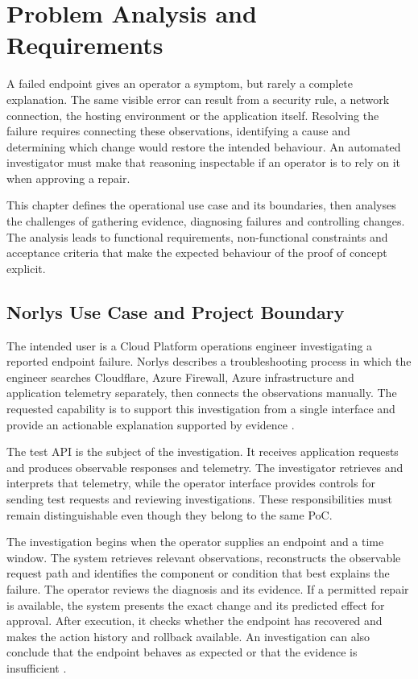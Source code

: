 \chapter{Problem Analysis and Requirements}
\label{cha:requirements}

A failed endpoint gives an operator a symptom, but rarely a complete
explanation. The same visible error can result from a security rule, a
network connection, the hosting environment or the application itself.
Resolving the failure requires connecting these observations, identifying
a cause and determining which change would restore the intended behaviour.
An automated investigator must make that reasoning inspectable if an
operator is to rely on it when approving a repair.

This chapter defines the operational use case and its boundaries, then
analyses the challenges of gathering evidence, diagnosing failures and
controlling changes. The analysis leads to functional requirements,
non-functional constraints and acceptance criteria that make the expected
behaviour of the proof of concept explicit.

\section{Norlys Use Case and Project Boundary}
\label{sec:requirements:context}

The intended user is a Cloud Platform operations engineer investigating a
reported endpoint failure. Norlys describes a troubleshooting process in
which the engineer searches Cloudflare, Azure Firewall, Azure infrastructure
and application telemetry separately, then connects the observations
manually. The requested capability is to support this investigation from a
single interface and provide an actionable explanation supported by
evidence \parencite[User Story, Background]{norlys_operations_agents}.

The test API is the subject of the investigation. It receives application
requests and produces observable responses and telemetry. The investigator
retrieves and interprets that telemetry, while the operator interface
provides controls for sending test requests and reviewing investigations.
These responsibilities must remain distinguishable even though they belong
to the same PoC.

The investigation begins when the operator supplies an endpoint and a time
window. The system retrieves relevant observations, reconstructs the
observable request path and identifies the component or condition that
best explains the failure. The operator reviews the diagnosis and its
evidence. If a permitted repair is available, the system presents the exact
change and its predicted effect for approval. After execution, it checks
whether the endpoint has recovered and makes the action history and rollback
available. An investigation can also conclude that the endpoint behaves as
expected or that the evidence is insufficient
\parencite[AC-4--AC-6]{norlys_operations_agents}.


